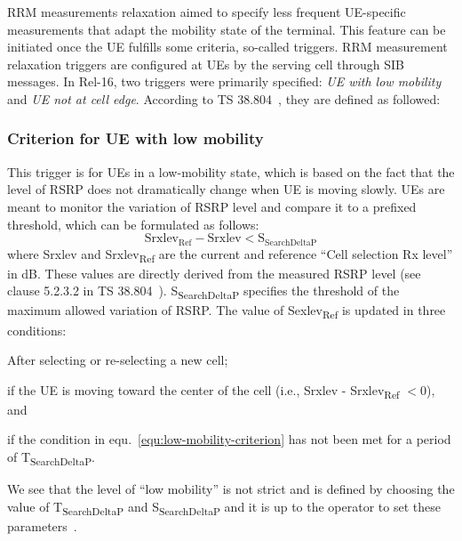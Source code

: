 \documentclass[]{IEEEtran}
\begin{document}
 RRM measurements relaxation aimed to specify less frequent UE-specific measurements that adapt the mobility state of the terminal. 
 This feature can be initiated once the UE fulfills some criteria, so-called triggers. 
 RRM measurement relaxation triggers are configured at UEs by the serving cell through SIB messages. 
 In Rel-16, two triggers were primarily specified: \textit{UE with low mobility} and \textit{UE not at cell edge}. According to TS 38.804~\cite{3gpp_study_nodate-4_38.804}, they are defined as followed:

\subsubsection*{\textbf{Criterion for UE with low mobility}}
This trigger is for UEs in a low-mobility state, which is based on the fact that the level of RSRP does not dramatically change when UE is moving slowly. 
UEs are meant to monitor the variation of RSRP level and compare it to a prefixed threshold, which can be formulated as follows:
\begin{equation}
\textrm{Srxlev}_{\textrm{Ref}}-\textrm{Srxlev}<\textrm{S}_{\textrm{SearchDeltaP}}
\label{equ:low-mobility-criterion}
\end{equation}
\noindent where Srxlev and Srxlev\textsubscript{Ref} are the current and reference ``Cell selection Rx level'' in dB.
These values are directly derived from the measured RSRP level (see clause 5.2.3.2 in TS 38.804~\cite{3gpp_nr_2022-10_38.304}).
S\textsubscript{SearchDeltaP} specifies the threshold of the maximum allowed variation of RSRP. 
The value of Sexlev\textsubscript{Ref} is updated in three conditions:
\begin{enumerate*}
    \item After selecting or re-selecting a new cell;
    \item if the UE is moving toward the center of the cell (i.e., Srxlev - Srxlev\textsubscript{Ref} $<0$), and
    \item if the condition in equ.~\ref{equ:low-mobility-criterion} has not been met for a period of T\textsubscript{SearchDeltaP}.
\end{enumerate*}
We see that the level of ``low mobility'' is not strict and is defined by choosing the value of T\textsubscript{SearchDeltaP} and  S\textsubscript{SearchDeltaP} and it is up to the operator to set these parameters~\cite{veedu_toward_2022_arXiv:2203.05634}.\\
\end{document}
